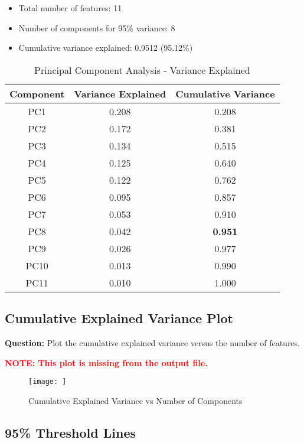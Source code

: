 \documentclass[11pt]{article}
\begin{document}
\begin{itemize}
    \item Total number of features: 11
    \item Number of components for 95\% variance: 8
    \item Cumulative variance explained: 0.9512 (95.12\%)
\end{itemize}

\begin{table}[H]
\centering
\caption{Principal Component Analysis - Variance Explained}
\begin{tabular}{ccc}
\toprule
\textbf{Component} & \textbf{Variance Explained} & \textbf{Cumulative Variance} \\
\midrule
PC1 & 0.208 & 0.208 \\
PC2 & 0.172 & 0.381 \\
PC3 & 0.134 & 0.515 \\
PC4 & 0.125 & 0.640 \\
PC5 & 0.122 & 0.762 \\
PC6 & 0.095 & 0.857 \\
PC7 & 0.053 & 0.910 \\
PC8 & 0.042 & \textbf{0.951} \\
PC9 & 0.026 & 0.977 \\
PC10 & 0.013 & 0.990 \\
PC11 & 0.010 & 1.000 \\
\bottomrule
\end{tabular}
\end{table}

\subsection{Cumulative Explained Variance Plot}

\textbf{Question:} Plot the cumulative explained variance versus the number of features.

\textcolor{red}{\textbf{NOTE: This plot is missing from the output file.}}

\begin{figure}[H]
    \centering
    \texttt{[image: ]}
    \caption{Cumulative Explained Variance vs Number of Components}
    \label{fig:pca_variance}
\end{figure}

\subsection{95\% Threshold Lines}
\end{document}
